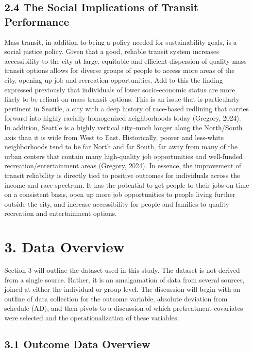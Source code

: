 \documentclass[
  12pt,
]{article}
\begin{document}
\subsection{2.4 The Social Implications of Transit
Performance}\label{the-social-implications-of-transit-performance}

Mass transit, in addition to being a policy needed for sustainability
goals, is a social justice policy. Given that a good, reliable transit
system increases accessibility to the city at large, equitable and
efficient dispersion of quality mass transit options allows for diverse
groups of people to access more areas of the city, opening up job and
recreation opportunities. Add to this the finding expressed previously
that individuals of lower socio-economic status are more likely to be
reliant on mass transit options. This is an issue that is particularly
pertinent in Seattle, a city with a deep history of race-based redlining
that carries forward into highly racially homogenized neighborhoods
today (Gregory, 2024). In addition, Seattle is a highly vertical
city--much longer along the North/South axis than it is wide from West
to East. Historically, poorer and less-white neighborhoods tend to be
far North and far South, far away from many of the urban centers that
contain many high-quality job opportunities and well-funded
recreation/entertainment areas (Gregory, 2024). In essence, the
improvement of transit reliability is directly tied to positive outcomes
for individuals across the income and race spectrum. It has the
potential to get people to their jobs on-time on a consistent basis,
open up more job opportunities to people living further outside the
city, and increase accessibility for people and families to quality
recreation and entertainment options.

\section{3. Data Overview}\label{data-overview}

Section 3 will outline the dataset used in this study. The dataset is
not derived from a single source. Rather, it is an amalgamation of data
from several sources, joined at either the individual or group level.
The discussion will begin with an outline of data collection for the
outcome variable, absolute deviation from schedule (AD), and then pivots
to a discussion of which pretreatment covariates were selected and the
operationalization of these variables.

\subsection{3.1 Outcome Data Overview}\label{outcome-data-overview}
\end{document}
